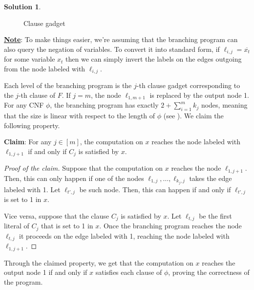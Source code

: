 \documentclass[12pt,a4paper]{report}
\theoremstyle{definition}
\newtheorem{solution}{Solution}
\begin{document}
\begin{solution}
\begin{enumerate}
\begin{figure}[H]
{\begin{tikzpicture}[->,>=stealth,shorten >=1pt,auto,node distance=3cm, thick,]
                    \end{tikzpicture}
                }

                \caption{Clause gadget}
            \end{figure}

            \underline{\textbf{Note}}: To make things easier, we're assuming that the branching program can also query the negation of variables. To convert it into standard form, if $\ell_{i,j} = \overline{x_t}$ for some variable $x_t$ then we can simply invert the labels on the edges outgoing from the node labeled with $\ell_{i,j}$.

            Each level of the branching program is the $j$-th clause gadget corresponding to the $j$-th clause of $F$. If $j = m$, the node $\ell_{1,m+1}$ is replaced by the output node 1. For any CNF $\phi$, the branching program has exactly $2+ \sum_{i = 1}^m k_j$ nodes, meaning that the size is linear with respect to the length of $\phi$ (see ). We claim the following property.
            
            \textbf{Claim}: For any $j \in [m]$, the computation on $x$ reaches the node labeled with $\ell_{1,j+1}$ if and only if $C_j$ is satisfied by $x$.

            \begin{proof}[Proof of the claim]
                Suppose that the computation on $x$ reaches the node $\ell_{1,j+1}$. Then, this can only happen if one of the nodes $\ell_{1,j}, \ldots, \ell_{k_j,j}$ takes the edge labeled with 1. Let $\ell_{t',j}$ be such node. Then, this can happen if and only if $\ell_{t',j}$ is set to 1 in $x$.

                Vice versa, suppose that the clause $C_j$ is satisfied by $x$. Let $\ell_{t, j}$ be the first literal of $C_j$ that is set to 1 in $x$. Once the branching program reaches the node $\ell_{t,j}$ it proceeds on the edge labeled with 1, reaching the node labeled with $\ell_{1,j+1}$.
            \end{proof}

            Through the claimed property, we get that the computation on $x$ reaches the output node 1 if and only if $x$ satisfies each clause of $\phi$, proving the correctness of the program.

            \begin{figure}[H]
                \centering

\end{figure}
\end{enumerate}
\end{solution}
\end{document}
